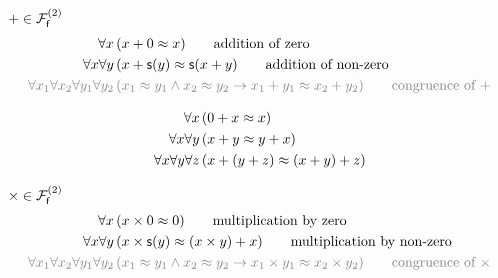 \begin{definition}
	[Addition]
	\label{def:addition:axioms}
	$+\in\mcFfn[2]$
\begin{align*}
\forall x\,
&(x+0 \mEQ x) 
\tag*{addition of zero}\\
\forall x\forall y\,
&(x+\msucc(y) \mEQ \msucc(x+y)
\tag*{addition of non-zero}
\\
\colG\forall x_1\forall x_2\forall y_1\forall y_2\,
&\colG (x_1\mEQ y_1\land x_2\mEQ y_2 \limp x_1+y_1\mEQ x_2+y_2)
\tag*{congruence of $+$}
\end{align*}
\end{definition}

\begin{lemma}
	\begin{align*}
	\forall x\,&(0+x \mEQ x)\\
	\forall x\forall y\,&(x+y \mEQ y+x)\\
	\forall x\forall y\forall z\,&(x+(y+z) \mEQ (x+y)+z)
	\end{align*}
\end{lemma}


\begin{definition}
	[Multiplikation]
	\label{tab:addition:axioms}
	$\times\in\mcFfn[2]$
	\begin{align*}
	\forall x\,
	&(x\times 0 \mEQ 0) 
	\tag*{multiplication by zero}\\
	\forall x\forall y\,
	&(x\times\msucc(y) \mEQ (x\times y) + x)
	\tag*{multiplication by non-zero}
	\\
	\colG\forall x_1\forall x_2\forall y_1\forall y_2\,
	&\colG (x_1\mEQ y_1\land x_2\mEQ y_2 \limp x_1\times y_1\mEQ x_2 \times y_2)
	\tag*{congruence of $\times$}
	\end{align*}
\end{definition}










